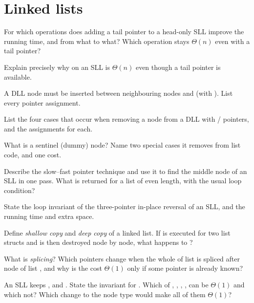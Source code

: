 \section*{Linked lists}
\begin{questions}[resume]
\item For which operations does adding a tail pointer to a head-only SLL improve the
  running time, and from what to what? Which operation stays $\Theta(n)$ even with a tail
  pointer?
\item Explain precisely why  on an SLL is $\Theta(n)$ even though a tail
  pointer is available.
\item A DLL node  must be inserted between neighbouring nodes  and 
  (with ). List every pointer assignment.
\item List the four cases that occur when removing a node  from a DLL with
  / pointers, and the assignments for each.
\item What is a sentinel (dummy) node? Name two special cases it removes from list code,
  and one cost.
\item Describe the slow--fast pointer technique and use it to find the middle node of an
  SLL in one pass. What is returned for a list of even length, with the usual loop
  condition?
\item State the loop invariant of the three-pointer in-place reversal of an SLL, and the
  running time and extra space.
\item Define \emph{shallow copy} and \emph{deep copy} of a linked list. If  is
  executed for two list structs and  is then destroyed node by node, what happens
  to ?
\item What is \emph{splicing}? Which pointers change when the whole of list  is
  spliced after node  of list , and why is the cost $\Theta(1)$ only if some
  pointer is already known?
\item An SLL keeps ,  and . State the invariant for .
  Which of , , , ,
   can be $\Theta(1)$ and which not? Which change to the node type would make
  all of them $\Theta(1)$?
\end{questions}

